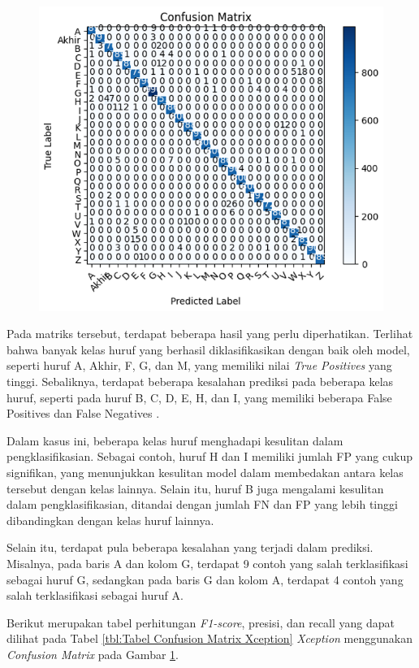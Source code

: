 \begin{figure}[!hbt]
	\centering
	\includegraphics[width=0.7\linewidth]{gambar/bener/ConfusionMatrix_ModelXception.png}
	\label{fig:confusionmatrixModelCNNXception}
\end{figure}

Pada matriks tersebut, terdapat beberapa hasil yang perlu diperhatikan. Terlihat bahwa banyak kelas huruf yang berhasil diklasifikasikan dengan baik oleh model, seperti huruf A, Akhir, F, G, dan M, yang memiliki nilai \textit{True Positives } yang tinggi. Sebaliknya, terdapat beberapa kesalahan prediksi pada beberapa kelas huruf, seperti pada huruf B, C, D, E, H, dan I, yang memiliki beberapa False Positives dan False Negatives .

Dalam kasus ini, beberapa kelas huruf menghadapi kesulitan dalam pengklasifikasian. Sebagai contoh, huruf H dan I memiliki jumlah FP yang cukup signifikan, yang menunjukkan kesulitan model dalam membedakan antara kelas tersebut dengan kelas lainnya. Selain itu, huruf B juga mengalami kesulitan dalam pengklasifikasian, ditandai dengan jumlah FN dan FP yang lebih tinggi dibandingkan dengan kelas huruf lainnya.

Selain itu, terdapat pula beberapa kesalahan yang terjadi dalam prediksi. Misalnya, pada baris A dan kolom G, terdapat 9 contoh yang salah terklasifikasi sebagai huruf G, sedangkan pada baris G dan kolom A, terdapat 4 contoh yang salah terklasifikasi sebagai huruf A.

Berikut merupakan tabel perhitungan \textit{F1-score}, presisi, dan recall yang dapat dilihat pada Tabel \ref{tbl:Tabel Confusion Matrix Xception} \textit{Xception} menggunakan \textit{Confusion Matrix} pada Gambar \ref{fig:confusionmatrixModelCNNXception}.

